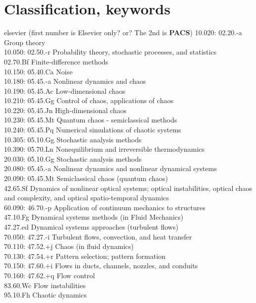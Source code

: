 \section{Classification, keywords}

						\noindent
elsevier (first number is Elsevier only? or? The 2nd is \textbf{PACS})
10.020: 02.20.-a Group theory	\\
10.050: 02.50.-r Probability theory, stochastic processes, and statistics 	\\
        02.70.Bf Finite-difference methods \\
10.150: 05.40.Ca Noise	\\
10.180: 05.45.-a Nonlinear dynamics and chaos	\\
10.190: 05.45.Ac Low-dimensional chaos	\\
10.210: 05.45.Gg Control of chaos, applications of chaos	\\
10.220: 05.45.Jn High-dimensional chaos	\\
10.230: 05.45.Mt Quantum chaos - semiclassical methods	\\
10.240: 05.45.Pq Numerical simulations of chaotic systems	\\
10.305: 05.10.Gg Stochastic analysis methods	\\
10.390: 05.70.Ln Nonequilibrium and irreversible thermodynamics	\\
20.030: 05.10.Gg Stochastic analysis methods	\\
20.080: 05.45.-a Nonlinear dynamics and nonlinear dynamical systems	\\
20.090: 05.45.Mt Semiclassical chaos (quantum chaos)	\\
        42.65.Sf Dynamics of nonlinear optical systems; optical instabilities,
                 optical chaos and complexity, and optical spatio-temporal dynamics \\
60.090: 46.70.-p Application of continuum mechanics to structures	\\
        47.10.Fg 	Dynamical systems methods (in Fluid Mechanics)	\\
        47.27.ed 	Dynamical systems approaches (turbulent flows)	\\
70.050: 47.27.-i Turbulent flows, convection, and heat transfer	\\
70.110: 47.52.+j Chaos (in fluid dynamics)	\\
70.130: 47.54.+r Pattern selection; pattern formation	\\
70.150: 47.60.+i Flows in ducts, channels, nozzles, and conduits	\\
70.160: 47.62.+q Flow control	\\
        83.60.Wc Flow instabilities \\
        95.10.Fh Chaotic dynamics



